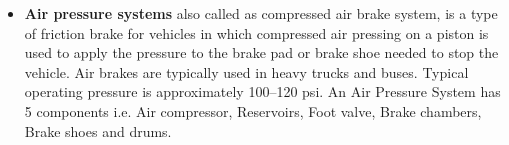 \begin{itemize}
	 \item \textbf{Air pressure systems} also called as compressed air brake system, is a type of friction brake for vehicles in which compressed air pressing on a piston is used to apply the pressure to the brake pad or brake shoe needed to stop the vehicle. Air brakes are typically used in heavy trucks and buses. Typical operating pressure is approximately 100–120 psi. An Air Pressure System has 5 components i.e. Air compressor, Reservoirs, Foot valve, Brake chambers, Brake shoes and drums.

\end{itemize}